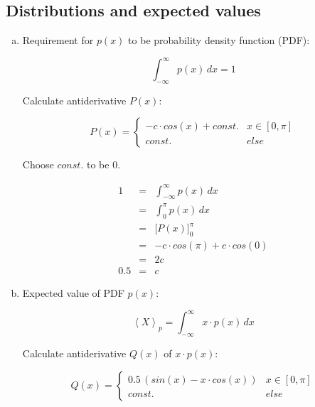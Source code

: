 \documentclass[11pt,a4paper]{article}
\begin{document}
\section{}

\subsection{Distributions and expected values}

\begin{enumerate}[a)]

\item

Requirement for $p(x)$ to be probability density function (PDF):

\begin{displaymath}
\int_{-\infty}^{\infty} p(x) \, dx = 1
\end{displaymath}

Calculate antiderivative $P(x)$:

\begin{displaymath}
P(x) = \begin{cases}
-c \cdot cos(x) + const.   & x \in [0, \pi]\\
const.                      & else
\end{cases}
\end{displaymath}

Choose $const.$ to be $0$.

\begin{eqnarray*}
1   &   = & \int_{-\infty}^\infty p(x) \, dx\\
    &   = & \int_0^\pi p(x) \, dx\\
    &   = & \Big[ P(x) \Big]_0^\pi\\
    &   = & -c \cdot cos(\pi) + c \cdot cos(0)\\
    &   = & 2c\\
0.5 &   = & c
\end{eqnarray*}

\item

Expected value of PDF $p(x)$:

\begin{displaymath}
\left\langle X \right\rangle_p = \int_{-\infty}^\infty x \cdot p(x) \, dx
\end{displaymath}

Calculate antiderivative $Q(x)$ of $x \cdot p(x)$:

\begin{displaymath}
Q(x) = \begin{cases}
0.5 \, (sin(x) - x \cdot cos(x))    & x \in [0, \pi]\\
const.                              & else
\end{cases}
\end{displaymath}


\end{enumerate}
\end{document}
